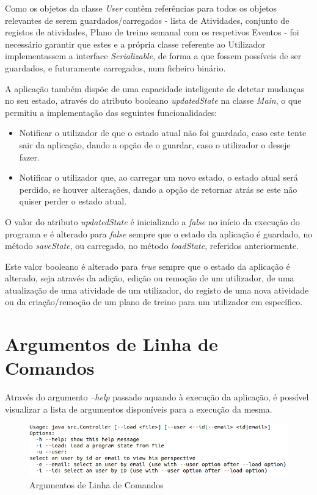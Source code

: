 \documentclass[a4paper,12pt]{scrreprt}
\begin{document}
Como os objetos da classe \textit{User} contêm referências para todos os objetos relevantes de serem guardados/carregados - lista de Atividades, conjunto de registos de atividades, Plano de treino semanal com os respetivos Eventos - foi necessário garantir que estes e a própria classe referente ao Utilizador implementassem a interface \textit{Serializable}, de forma a que fossem possíveis de ser guardados, e futuramente carregados, num ficheiro binário.

A aplicação também dispõe de uma capacidade inteligente de detetar mudanças no seu estado, através do atributo booleano \textit{updatedState} na classe \textit{Main}, o que permitiu a implementação das seguintes funcionalidades:

\begin{itemize}
    \item Notificar o utilizador de que o estado atual não foi guardado, caso este tente sair da aplicação, dando a opção de o guardar, caso o utilizador o deseje fazer.
    \item Notificar o utilizador que, ao carregar um novo estado, o estado atual será perdido, se houver alterações, dando a opção de retornar atrás se este não quiser perder o estado atual.
\end{itemize}

O valor do atributo \textit{updatedState} é inicializado a \textit{false} no início da execução do programa e é alterado para \textit{false} sempre que o estado da aplicação é guardado, no método \textit{saveState}, ou carregado, no método \textit{loadState}, referidos anteriormente.

Este valor booleano é alterado para \textit{true} sempre que o estado da aplicação é alterado, seja através da adição, edição ou remoção de um utilizador, de uma atualização de uma atividade de um utilizador, do registo de uma nova atividade ou da criação/remoção de um plano de treino para um utilizador em específico.

\clearpage
\section{Argumentos de Linha de Comandos}
    Através do argumento \textit{--help} passado aquando à execução da aplicação, é possível visualizar a lista de argumentos disponíveis para a execução da mesma.

    \begin{figure}[!ht]
        \centering
        \includegraphics[width=\textwidth]{images/help_option.png}
        \caption{Argumentos de Linha de Comandos}
        \label{fig:opcao-help}
    \end{figure}
\end{document}
